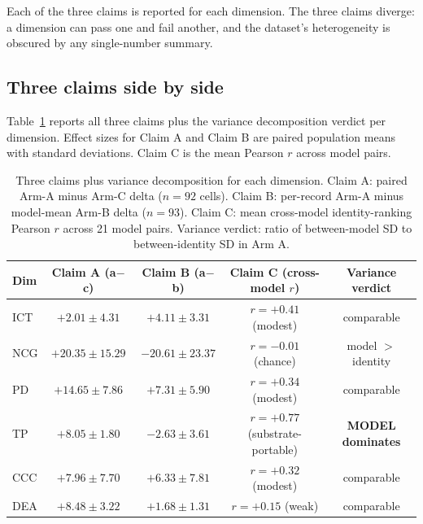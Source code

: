 \documentclass[11pt]{article}
\begin{document}
Each of the three claims is reported for each dimension. The three claims diverge: a dimension can pass one and fail another, and the dataset's heterogeneity is obscured by any single-number summary.

\subsection{Three claims side by side}
\label{sec:results-table}

Table~\ref{tab:three-claims} reports all three claims plus the variance decomposition verdict per dimension. Effect sizes for Claim A and Claim B are paired population means with standard deviations. Claim C is the mean Pearson $r$ across model pairs.

\begin{table}[h]
\caption{Three claims plus variance decomposition for each dimension. Claim A: paired Arm-A minus Arm-C delta ($n = 92$ cells). Claim B: per-record Arm-A minus model-mean Arm-B delta ($n = 93$). Claim C: mean cross-model identity-ranking Pearson $r$ across 21 model pairs. Variance verdict: ratio of between-model SD to between-identity SD in Arm A.}
\label{tab:three-claims}
\centering
\small
\begin{tabular}{lcccc}
\toprule
Dim & Claim A (a$-$c) & Claim B (a$-$b) & Claim C (cross-model $r$) & Variance verdict \\
\midrule
ICT &  $+2.01 \pm 4.31$  &  $+4.11 \pm 3.31$  &  $r = +0.41$ (modest)         & comparable \\
NCG & $+20.35 \pm 15.29$ & $-20.61 \pm 23.37$ &  $r = -0.01$ (chance)         & model $>$ identity \\
PD  & $+14.65 \pm 7.86$  &  $+7.31 \pm 5.90$  &  $r = +0.34$ (modest)         & comparable \\
TP  &  $+8.05 \pm 1.80$  &  $-2.63 \pm 3.61$  &  $r = +0.77$ (substrate-portable) & \textbf{MODEL dominates} \\
CCC &  $+7.96 \pm 7.70$  &  $+6.33 \pm 7.81$  &  $r = +0.32$ (modest)         & comparable \\
DEA &  $+8.48 \pm 3.22$  &  $+1.68 \pm 1.31$  &  $r = +0.15$ (weak)           & comparable \\
\bottomrule
\end{tabular}
\end{table}
\end{document}

